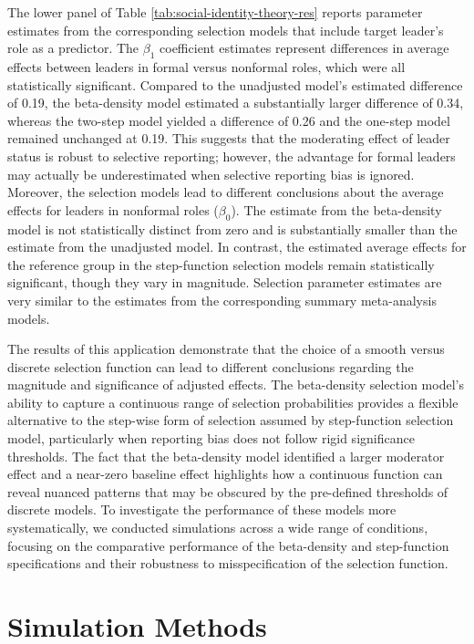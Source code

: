 \documentclass[
  american,
  man, donotrepeattitle,floatsintext]{apa7}
\begin{document}
The lower panel of Table \ref{tab:social-identity-theory-res} reports parameter estimates from the corresponding selection models that include target leader's role as a predictor.
The \(\beta_1\) coefficient estimates represent differences in average effects between leaders in formal versus nonformal roles, which were all statistically significant.
Compared to the unadjusted model's estimated difference of 0.19, the beta-density model estimated a substantially larger difference of 0.34, whereas the two-step model yielded a difference of 0.26 and the one-step model remained unchanged at 0.19.
This suggests that the moderating effect of leader status is robust to selective reporting; however, the advantage for formal leaders may actually be underestimated when selective reporting bias is ignored.
Moreover, the selection models lead to different conclusions about the average effects for leaders in nonformal roles (\(\beta_0\)). The estimate from the beta-density model is not statistically distinct from zero and is substantially smaller than the estimate from the unadjusted model.
In contrast, the estimated average effects for the reference group in the step-function selection models remain statistically significant, though they vary in magnitude.
Selection parameter estimates are very similar to the estimates from the corresponding summary meta-analysis models.

The results of this application demonstrate that the choice of a smooth versus discrete selection function can lead to different conclusions regarding the magnitude and significance of adjusted effects. The beta-density selection model's ability to capture a continuous range of selection probabilities provides a flexible alternative to the step-wise form of selection assumed by step-function selection model, particularly when reporting bias does not follow rigid significance thresholds.
The fact that the beta-density model identified a larger moderator effect and a near-zero baseline effect highlights how a continuous function can reveal nuanced patterns that may be obscured by the pre-defined thresholds of discrete models.
To investigate the performance of these models more systematically, we conducted simulations across a wide range of conditions, focusing on the comparative performance of the beta-density and step-function specifications and their robustness to misspecification of the selection function.

\section{Simulation Methods}\label{simulation-methods}
\end{document}
